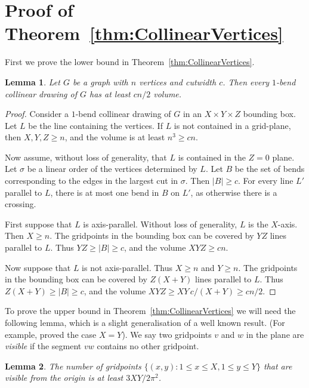 \documentclass[a4paper]{article}
\newcommand{\mySection}[2]{\section{#1}\seclabel{#2}}
\newcommand{\seclabel}[1]{\label{sec:#1}}
\newcommand{\lemlabel}[1]{\label{lem:#1}}
\newcommand{\thmref}[1]{Theorem~\ref{thm:#1}}
\theoremstyle{plain}
\newtheorem{lemma}{Lemma}
\begin{document}
\mySection{Proof of \thmref{CollinearVertices}}{Collinear}

First we prove the lower bound in \thmref{CollinearVertices}.

\begin{lemma}
\lemlabel{CutwidthLowerBound}
Let $G$ be a graph with $n$ vertices and cutwidth $c$. Then every $1$-bend collinear drawing of $G$ has at least $cn/2$ volume.
\end{lemma}

\begin{proof} Consider a $1$-bend collinear drawing of $G$ in an $X\times Y\times Z$  bounding box. Let $L$ be the line containing the vertices.  If $L$ is not contained in a grid-plane, then $X,Y,Z\geq n$, and the volume is at least $n^3\geq cn$. 

Now assume, without loss of generality, that $L$ is contained in the $Z=0$ plane.  Let $\sigma$ be a linear order of the vertices determined by $L$.  Let $B$ be the set of bends corresponding to the edges in the largest cut in $\sigma$. Then $|B|\geq c$. For every line $L'$ parallel to $L$, there is at most one bend in $B$ on $L'$, as otherwise there is a crossing. 

First suppose that $L$ is axis-parallel. Without loss of generality, $L$ is the $X$-axis. Then $X\geq n$. The gridpoints in the bounding box can be covered by $YZ$ lines parallel to $L$.  Thus $YZ\geq|B|\geq c$, and the volume $XYZ\geq cn$.

Now suppose that $L$ is not axis-parallel. Thus $X\geq n$ and $Y\geq n$. The gridpoints in the bounding box can be covered by $Z(X+Y)$ lines parallel to $L$.  Thus $Z(X+Y)\geq|B|\geq c$, and the volume $XYZ\geq XY\,c/(X+Y)\geq cn/2$. \end{proof}


To prove the upper bound in \thmref{CollinearVertices} we will need the
following lemma, which is a slight generalisation of a well known result. (For
example, \citet{PTT99} proved the case $X=Y$). We say two gridpoints $v$
and $w$ in the plane are \emph{visible} if the segment $vw$ contains no other
gridpoint.

\begin{lemma}
\lemlabel{VisiblePoints}
The number of gridpoints $\{(x,y):1\leq x\leq X,1\leq y\leq Y\}$ that are
visible from the origin is at least $3XY/2\pi^2$.
\end{lemma}
\end{document}
